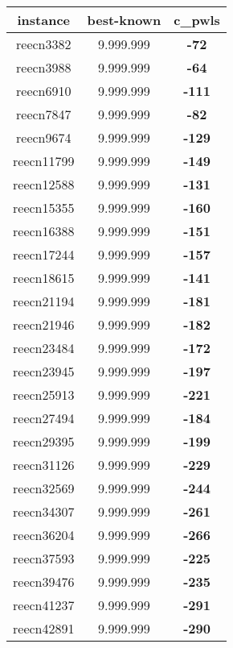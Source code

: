 \begin{tabular}{cc||c}
instance & best-known & c\_pwls \\ 
 \hline 
reecn3382        & 9.999.999        & {\bf -72}       \\ 
reecn3988        & 9.999.999        & {\bf -64}       \\ 
reecn6910        & 9.999.999        & {\bf -111}      \\ 
reecn7847        & 9.999.999        & {\bf -82}       \\ 
reecn9674        & 9.999.999        & {\bf -129}      \\ 
reecn11799       & 9.999.999        & {\bf -149}      \\ 
reecn12588       & 9.999.999        & {\bf -131}      \\ 
reecn15355       & 9.999.999        & {\bf -160}      \\ 
reecn16388       & 9.999.999        & {\bf -151}      \\ 
reecn17244       & 9.999.999        & {\bf -157}      \\ 
reecn18615       & 9.999.999        & {\bf -141}      \\ 
reecn21194       & 9.999.999        & {\bf -181}      \\ 
reecn21946       & 9.999.999        & {\bf -182}      \\ 
reecn23484       & 9.999.999        & {\bf -172}      \\ 
reecn23945       & 9.999.999        & {\bf -197}      \\ 
reecn25913       & 9.999.999        & {\bf -221}      \\ 
reecn27494       & 9.999.999        & {\bf -184}      \\ 
reecn29395       & 9.999.999        & {\bf -199}      \\ 
reecn31126       & 9.999.999        & {\bf -229}      \\ 
reecn32569       & 9.999.999        & {\bf -244}      \\ 
reecn34307       & 9.999.999        & {\bf -261}      \\ 
reecn36204       & 9.999.999        & {\bf -266}      \\ 
reecn37593       & 9.999.999        & {\bf -225}      \\ 
reecn39476       & 9.999.999        & {\bf -235}      \\ 
reecn41237       & 9.999.999        & {\bf -291}      \\ 
reecn42891       & 9.999.999        & {\bf -290}      \\ 

\end{tabular}
